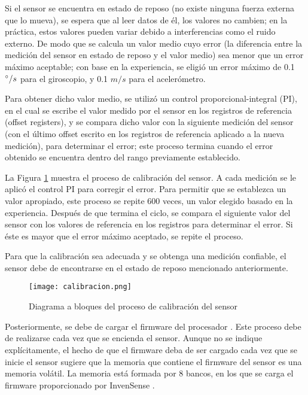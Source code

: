 Si el sensor se encuentra en estado de reposo (no existe ninguna fuerza externa que lo mueva), se espera que al leer datos de él, los valores no cambien; en la práctica, estos valores pueden variar debido a interferencias como el ruido externo. De modo que se calcula un valor medio cuyo error (la diferencia entre la medición del sensor en estado de reposo y el valor medio) sea menor que un error máximo aceptable; con base en la experiencia, se eligió un error máximo de 0.1 $\degree/s$ para el giroscopio, y 0.1 $m/s$ para el acelerómetro.

Para obtener dicho valor medio, se utilizó un control proporcional-integral (PI), en el cual se escribe el valor medido por el sensor en los registros de referencia (offset registers), y se compara dicho valor con la siguiente medición del sensor (con el último offset escrito en los registros de referencia aplicado a la nueva medición), para determinar el error; este proceso termina cuando el error obtenido se encuentra dentro del rango previamente establecido.

La Figura \ref{fig:calibracion} muestra el proceso de calibración del sensor. A cada medición se le aplicó el control PI para corregir el error. Para permitir que se establezca un valor apropiado, este proceso se repite 600 veces, un valor elegido basado en la experiencia. Después de que termina el ciclo, se compara el siguiente valor del sensor con los valores de referencia en los registros para determinar el error. Si éste es mayor que el error máximo aceptado, se repite el proceso.

Para que la calibración sea adecuada y se obtenga una medición confiable, el sensor debe de encontrarse en el estado de reposo mencionado anteriormente.

\begin{figure}[htb]
	\centering
	\texttt{[image: calibracion.png]}
	\caption{Diagrama a bloques del proceso de calibración del sensor}
	\label{fig:calibracion}
\end{figure}

Posteriormente, se debe de cargar el firmware del procesador \cite{userguideMotionDriver}. Este proceso debe de realizarse cada vez que se encienda el sensor. Aunque no se indique explícitamente, el hecho de que el firmware deba de ser cargado cada vez que se inicie el sensor sugiere que la memoria que contiene el firmware del sensor es una memoria volátil. La memoria está formada por 8 bancos, en los que se carga el firmware proporcionado por InvenSense \cite{userguideMotionDriver}. 

